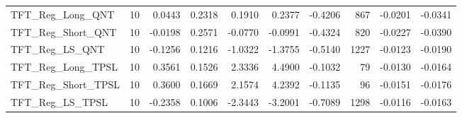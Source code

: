 \begin{tabular}{llrrrrrrrr}
TFT\_Reg\_Long\_QNT & 10 & 0.0443 & 0.2318 & 0.1910 & 0.2377 & -0.4206 & 867 & -0.0201 & -0.0341 \\
\cline{1-10}
TFT\_Reg\_Short\_QNT & 10 & -0.0198 & 0.2571 & -0.0770 & -0.0991 & -0.4324 & 820 & -0.0227 & -0.0390 \\
\cline{1-10}
TFT\_Reg\_LS\_QNT & 10 & -0.1256 & 0.1216 & -1.0322 & -1.3755 & -0.5140 & 1227 & -0.0123 & -0.0190 \\
\cline{1-10}
TFT\_Reg\_Long\_TPSL & 10 & 0.3561 & 0.1526 & 2.3336 & 4.4900 & -0.1032 & 79 & -0.0130 & -0.0164 \\
\cline{1-10}
TFT\_Reg\_Short\_TPSL & 10 & 0.3600 & 0.1669 & 2.1574 & 4.2392 & -0.1135 & 96 & -0.0151 & -0.0176 \\
\cline{1-10}
TFT\_Reg\_LS\_TPSL & 10 & -0.2358 & 0.1006 & -2.3443 & -3.2001 & -0.7089 & 1298 & -0.0116 & -0.0163 \\
\cline{1-10}
\bottomrule
\end{tabular}
